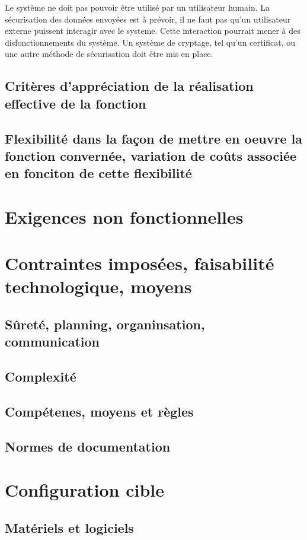 Le système ne doit pas pouvoir être utilisé par un utilisateur humain. La sécurisation des données envoyées est à prévoir, il ne faut pas qu'un utilisateur externe puissent interagir avec le systeme. Cette interaction pourrait mener à des disfonctionnements du système. Un système de cryptage, tel qu'un certificat, ou une autre méthode de sécurisation doit être mis en place.

\subsection{Critères d'appréciation de la réalisation effective de la fonction}
\subsection{Flexibilité dans la façon de mettre en oeuvre la fonction convernée, variation de coûts associée en fonciton de cette flexibilité}

\section{Exigences non fonctionnelles}

\section{Contraintes imposées, faisabilité technologique, moyens}
\subsection{Sûreté, planning, organinsation, communication}
\subsection{Complexité}
\subsection{Compétenes, moyens et règles}
\subsection{Normes de documentation}

\section{Configuration cible}
\subsection{Matériels et logiciels}
